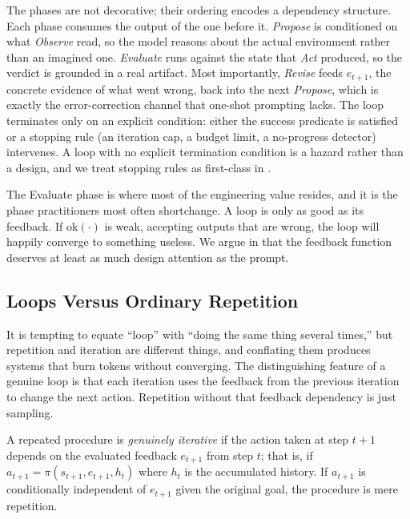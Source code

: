 The phases are not decorative; their ordering encodes a dependency structure. Each phase consumes the output of the one before it. \emph{Propose} is conditioned on what \emph{Observe} read, so the model reasons about the actual environment rather than an imagined one. \emph{Evaluate} runs against the state that \emph{Act} produced, so the verdict is grounded in a real artifact. Most importantly, \emph{Revise} feeds $e_{t+1}$, the concrete evidence of what went wrong, back into the next \emph{Propose}, which is exactly the error-correction channel that one-shot prompting lacks. The loop terminates only on an explicit condition: either the success predicate is satisfied or a stopping rule (an iteration cap, a budget limit, a no-progress detector) intervenes. A loop with no explicit termination condition is a hazard rather than a design, and we treat stopping rules as first-class in .

\begin{remark}
The Evaluate phase is where most of the engineering value resides, and it is the phase practitioners most often shortchange. A loop is only as good as its feedback. If $\mathrm{ok}(\cdot)$ is weak, accepting outputs that are wrong, the loop will happily converge to something useless. We argue in  that the feedback function deserves at least as much design attention as the prompt.
\end{remark}

\subsection{Loops Versus Ordinary Repetition}\label{subsec:loops-vs-repetition}

It is tempting to equate ``loop'' with ``doing the same thing several times,'' but repetition and iteration are different things, and conflating them produces systems that burn tokens without converging. The distinguishing feature of a genuine loop is that each iteration uses the feedback from the previous iteration to change the next action. Repetition without that feedback dependency is just sampling.

\begin{definition}\label{def:genuine-iteration}
A repeated procedure is \emph{genuinely iterative} if the action taken at step $t+1$ depends on the evaluated feedback $e_{t+1}$ from step $t$; that is, if $a_{t+1} = \pi(s_{t+1}, e_{t+1}, h_t)$ where $h_t$ is the accumulated history. If $a_{t+1}$ is conditionally independent of $e_{t+1}$ given the original goal, the procedure is mere repetition.
\end{definition}

